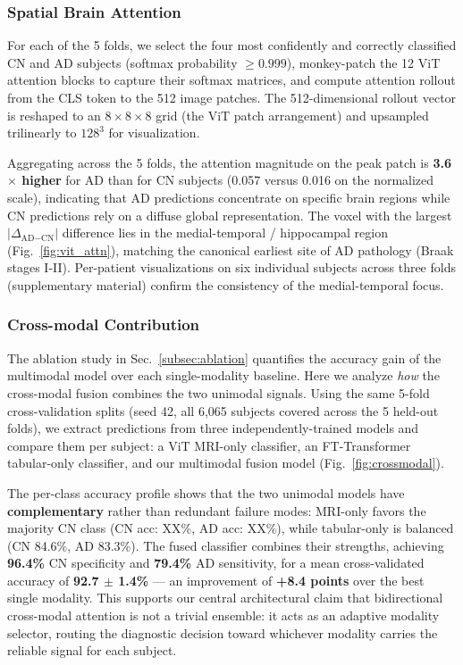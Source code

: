 \subsubsection{Spatial Brain Attention}

For each of the 5 folds, we select the four most confidently and correctly classified CN and AD subjects (softmax probability $\geq 0.999$), monkey-patch the 12 ViT attention blocks to capture their softmax matrices, and compute attention rollout from the CLS token to the 512 image patches. The 512-dimensional rollout vector is reshaped to an $8 \times 8 \times 8$ grid (the ViT patch arrangement) and upsampled trilinearly to $128^3$ for visualization.

Aggregating across the 5 folds, the attention magnitude on the peak patch is \textbf{3.6$\times$ higher} for AD than for CN subjects (0.057 versus 0.016 on the normalized scale), indicating that AD predictions concentrate on specific brain regions while CN predictions rely on a diffuse global representation. The voxel with the largest $|\Delta_{\text{AD}-\text{CN}}|$ difference lies in the medial-temporal / hippocampal region (Fig.~\ref{fig:vit_attn}), matching the canonical earliest site of AD pathology (Braak stages I-II). Per-patient visualizations on six individual subjects across three folds (supplementary material) confirm the consistency of the medial-temporal focus.

\subsubsection{Cross-modal Contribution}

The ablation study in Sec.~\ref{subsec:ablation} quantifies the accuracy gain of the multimodal model over each single-modality baseline. Here we analyze \emph{how} the cross-modal fusion combines the two unimodal signals. Using the same 5-fold cross-validation splits (seed 42, all 6{,}065 subjects covered across the 5 held-out folds), we extract predictions from three independently-trained models and compare them per subject: a ViT MRI-only classifier, an FT-Transformer tabular-only classifier, and our multimodal fusion model (Fig.~\ref{fig:crossmodal}).

The per-class accuracy profile shows that the two unimodal models have \textbf{complementary} rather than redundant failure modes: MRI-only favors the majority CN class (CN acc: XX\%, AD acc: XX\%), while tabular-only is balanced (CN 84.6\%, AD 83.3\%). The fused classifier combines their strengths, achieving \textbf{96.4\%} CN specificity and \textbf{79.4\%} AD sensitivity, for a mean cross-validated accuracy of \textbf{92.7 $\pm$ 1.4\%} — an improvement of \textbf{+8.4 points} over the best single modality. This supports our central architectural claim that bidirectional cross-modal attention is not a trivial ensemble: it acts as an adaptive modality selector, routing the diagnostic decision toward whichever modality carries the reliable signal for each subject.

